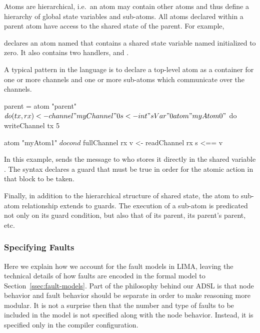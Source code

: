 \begin{itemize}
Atoms are hierarchical, i.e.\ an atom may contain other atoms and thus define a
hierarchy of global state variables and sub-atoms. All atoms declared
within a parent atom have access to the shared state of the parent. For example,

\noindent
declares an atom named  that contains a shared state
variable named  initialized to zero. It also contains two
handlers,  and .
\end{itemize}

A typical pattern in the language is to declare a top-level atom as a
container for one or more channels and one or more sub-atoms which communicate
over the channels.

\begin{lima}
parent = atom "parent" $ do
  (tx, rx) <- channel "myChannel" 0
  s <- int "sVar" 0

  atom "myAtom0" $ do
    writeChannel tx 5

  atom "myAtom1" $ do
    cond $ fullChannel rx
    v <- readChannel rx
    s <== v
\end{lima}

\noindent
In this example,  sends the message  to  who stores
it directly in the shared variable . The syntax 
declares a guard that must be true in order for the atomic action in that
block to be taken.

Finally, in addition to the hierarchical structure of shared state, the atom
to sub-atom relationship extends to guards. The execution of a sub-atom is
predicated not only on its guard condition, but also that of its parent, its
parent's parent, etc.

\subsubsection{Specifying Faults}

Here we  explain how we account for the fault models in LIMA, leaving the
technical details of how faults are encoded in the formal model to Section~\ref{ssec:fault-models}. Part of the philosophy behind our ADSL is that node
behavior and fault behavior should be separate in order to make reasoning
more modular. It is not a surprise then that the number and type of faults to
be included in the model is not specified along with the node behavior.
Instead, it is specified only in the compiler configuration.

